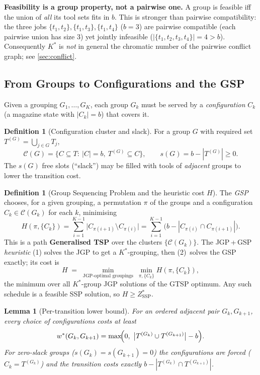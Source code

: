 \documentclass[11pt,a4paper]{article}
\theoremstyle{plain}
\newtheorem{lemma}[theorem]{Lemma}
\theoremstyle{definition}
\newtheorem{definition}[theorem]{Definition}
\newcommand{\Kstar}{K^{*}}
\newcommand{\ZSSP}{Z_{\mathrm{SSP}}^{*}}
\begin{document}
\begin{warnbox}
\textbf{Feasibility is a group property, not a pairwise one.}
A group is feasible iff the union of \emph{all} its tool sets fits in $b$. This is
stronger than pairwise compatibility: the three jobs $\{t_1,t_2\},\{t_1,t_3\},\{t_1,t_4\}$
($b=3$) are pairwise compatible (each pairwise union has size $3$) yet jointly infeasible
($|\{t_1,t_2,t_3,t_4\}|=4>b$). Consequently $\Kstar$ is \emph{not} in general the
chromatic number of the pairwise conflict graph; see \cref{sec:conflict}.
\end{warnbox}

\subsection{From Groups to Configurations and the GSP}

Given a grouping $G_1,\dots,G_K$, each group $G_k$ must be served by a
\emph{configuration} $C_k$ (a magazine state with $|C_k|=b$) that covers it.

\begin{definition}[Configuration cluster and slack]
For a group $G$ with required set $T^{(G)}=\bigcup_{j\in G}T_j$,
\[
  \mathcal{C}(G)=\bigl\{C\subseteq T:\ |C|=b,\ T^{(G)}\subseteq C\bigr\},
  \qquad s(G)=b-|T^{(G)}|\ge 0 .
\]
The $s(G)$ free slots (``slack'') may be filled with tools of \emph{adjacent} groups
to lower the transition cost.
\end{definition}

\begin{definition}[Group Sequencing Problem and the heuristic cost $H$]
\label{def:heuristic}
The \emph{GSP} chooses, for a given grouping, a permutation $\pi$ of the groups and a
configuration $C_k\in\mathcal{C}(G_k)$ for each $k$, minimising
\[
  H(\pi,\{C_k\})=\sum_{i=1}^{K-1}\bigl|C_{\pi(i+1)}\setminus C_{\pi(i)}\bigr|
  =\sum_{i=1}^{K-1}\bigl(b-|C_{\pi(i)}\cap C_{\pi(i+1)}|\bigr).
\]
This is a path \textbf{Generalised TSP} over the clusters $\{\mathcal{C}(G_k)\}$. The
JGP\,+\,GSP \emph{heuristic} (1) solves the JGP to get a $\Kstar$-grouping, then
(2)~solves the GSP exactly; its cost is
\[
  H \;=\; \min_{\text{JGP-optimal groupings}}\ \min_{\pi,\{C_k\}} H(\pi,\{C_k\}),
\]
the minimum over all $\Kstar$-group JGP solutions of the GTSP optimum. Any such schedule
is a feasible SSP solution, so $H\ge\ZSSP$.
\end{definition}

\begin{thmbox}
\begin{lemma}[Per-transition lower bound]
\label{lem:transition}
For an ordered adjacent pair $G_k,G_{k+1}$, every choice of configurations costs at least
\[
  w^{*}(G_k,G_{k+1})=\max\!\Bigl(0,\ \bigl|T^{(G_k)}\cup T^{(G_{k+1})}\bigr|-b\Bigr).
\]
For \emph{zero-slack} groups ($s(G_k)=s(G_{k+1})=0$) the configurations are forced
($C_k=T^{(G_k)}$) and the transition costs exactly $b-|T^{(G_k)}\cap T^{(G_{k+1})}|$.
\end{lemma}
\end{thmbox}
\end{document}
